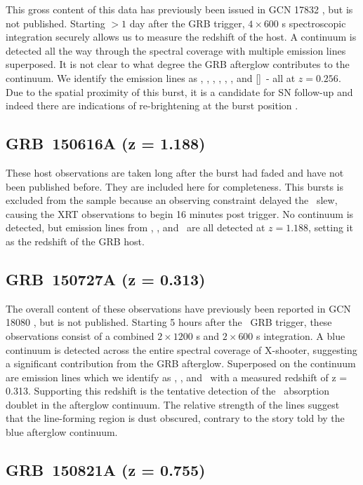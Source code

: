 \documentclass[longauth]{aa}    %
\begin{document}
This gross content of this data has previously been issued in GCN 17832
\citep{GCN17832}, but is not published. Starting $> 1$ day after the GRB
trigger, $4 \times 600$ s spectroscopic integration securely allows us to
measure the redshift of the host. A continuum is detected all the way through
the spectral coverage with multiple emission lines superposed. It is not clear
to what degree the GRB afterglow contributes to the continuum. We identify the
emission lines as \oii, \hb, \oiii, \ha, \niil, \ha, and [\sii]~- all at $z =
0.256$. Due to the spatial proximity of this burst, it is a candidate for SN
follow-up and indeed there are indications of re-brightening at the burst
position \citep[GCN 17903;][]{GCN17903}.

\subsection{GRB~150616A (z = 1.188)}\label{150616}

These host observations are taken long after the burst had faded  and have not
been published before. They are included here for completeness. This bursts is
excluded from the sample because an observing constraint delayed the
\swift~slew, causing the XRT observations to begin 16 minutes post trigger. No
continuum is detected, but emission lines from \oii, \oiii, and \ha~are all
detected at $z = 1.188$, setting it as the redshift of the GRB host.

\subsection{GRB~150727A (z = 0.313)}\label{150727}

The overall content of these observations have previously been reported in GCN
18080 \citep{GCN18080}, but is not published. Starting 5 hours after the
\swift~GRB trigger, these observations consist of a combined $2 \times 1200$ s
and $2 \times 600$ s integration. A blue continuum is detected across the entire spectral
coverage of X-shooter, suggesting a significant contribution from the GRB
afterglow. Superposed on the continuum are emission lines which we identify as
\hb, \oiii, and \ha~with a measured redshift of z = 0.313. Supporting this
redshift is the tentative detection of the \mgii~absorption doublet in the
afterglow continuum. The relative strength of the lines suggest that the
line-forming region is dust obscured, contrary to the story told by the blue
afterglow continuum.

\subsection{GRB~150821A (z = 0.755)}\label{150821}
\end{document}
